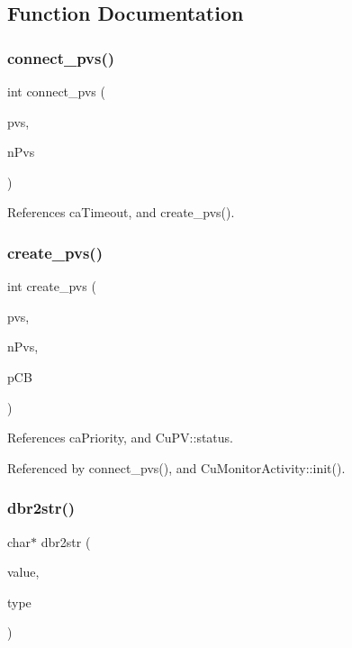 \subsection{Function Documentation}
\mbox{\label{cuepics-world_8cpp_a9b5b6025321a6802e5c0e16fc5f7ce9a}} 
\subsubsection{connect\+\_\+pvs()}
{\footnotesize\ttfamily int connect\+\_\+pvs (\begin{DoxyParamCaption}\item[{\textbf{ Cu\+PV} $\ast$}]{pvs,  }\item[{int}]{n\+Pvs }\end{DoxyParamCaption})}



References ca\+Timeout, and create\+\_\+pvs().

\mbox{\label{cuepics-world_8cpp_a0e2d4c91a34468490cbfccf013e05ea5}} 
\subsubsection{create\+\_\+pvs()}
{\footnotesize\ttfamily int create\+\_\+pvs (\begin{DoxyParamCaption}\item[{\textbf{ Cu\+PV} $\ast$}]{pvs,  }\item[{int}]{n\+Pvs,  }\item[{ca\+Ch $\ast$}]{p\+CB }\end{DoxyParamCaption})}



References ca\+Priority, and Cu\+P\+V\+::status.



Referenced by connect\+\_\+pvs(), and Cu\+Monitor\+Activity\+::init().

\mbox{\label{cuepics-world_8cpp_a703b41b0f7b2221eff13d827ae0ab9b3}} 
\subsubsection{dbr2str()}
{\footnotesize\ttfamily char$\ast$ dbr2str (\begin{DoxyParamCaption}\item[{const void $\ast$}]{value,  }\item[{unsigned}]{type }\end{DoxyParamCaption})}



